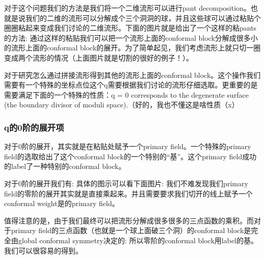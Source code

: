 对于这个问题我们的方法是我们将一个二维流形可以进行pant decomposition。也就是说我们的二维的流形可以分解成个三个洞洞的球，并且这些球可以通过粘贴个圈圈粘起来变成我们讨论的二维流形。下面的图片就是给出了一个这样的粘pants的方法:
通过这样的粘贴我们可以把一个流形上面的conformal block分解成很多小的流形上面的conformal block的展开。为了简单起见，我们考虑流形上就只切一圈变成两个流形的情况（上面图片就是切割的很好的例子！）。

对于研究怎么通过拼接流形得到其他的流形上面的conformal block。这个操作我们需要有一个特殊的坐标点位这个q需要根据我们讨论的流形仔细选取。更重要的是需要满足下面的一个特殊的性质：q = 0 corresponds to the degenerate surface (the boundary divisor of moduli space).（好的，我也不懂这是啥性质（x）


\subsubsection{q的0阶的展开项}
对于0阶的展开，其实就是在粘贴处赋予一个primary field。一个特殊的primary field的选取给出了这个conformal block的一个特别的“基”。这个primary field成功的label了一种特别的conformal block。

对于0阶的展开我们有:
具体的图示可以看下面图片:
我们不难发现我们primary field的零阶的展开其实就是直接乘起来。并且需要要求我们切开的线上赋予一个conformal weight是\seq{\Delta}的primary field。

值得注意的是，由于我们最终可以把流形分解成很多很多的三点函数的乘积。而对于primary field的三点函数（也就是一个球上面破三个洞）的conformal block是完全由global conformal symmetry决定的:
所以零阶的conformal block用\seq{\Delta}label的基。我们可以很容易的得到。


